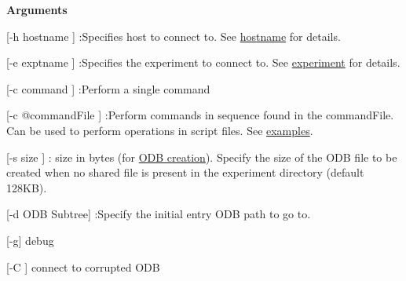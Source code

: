 \begin{DoxyItemize}
\item {\bfseries  Arguments }
\begin{DoxyItemize}
\item \mbox{[}-\/h hostname \mbox{]} :Specifies host to connect to. See \hyperlink{F_Utilities_List_F_utilities_params}{hostname} for details.
\item \mbox{[}-\/e exptname \mbox{]} :Specifies the experiment to connect to. See \hyperlink{F_Utilities_List_F_utilities_params}{experiment} for details.
\item \mbox{[}-\/c command \mbox{]} :Perform a single command
\item \mbox{[}-\/c @commandFile \mbox{]} :Perform commands in sequence found in the commandFile. Can be used to perform operations in script files. See \hyperlink{RC_odbedit_examples_RC_odbedit_extcommand}{examples}.
\item \mbox{[}-\/s size \mbox{]} : size in bytes (for \hyperlink{RC_odbedit_examples_RC_odbedit_create_ODB}{ODB creation}). Specify the size of the ODB file to be created when no shared file is present in the experiment directory (default 128KB).
\item \mbox{[}-\/d ODB Subtree\mbox{]} :Specify the initial entry ODB path to go to.
\item \mbox{[}-\/g\mbox{]} debug
\item \mbox{[}-\/C \mbox{]} connect to corrupted ODB
\end{DoxyItemize}
\end{DoxyItemize}


